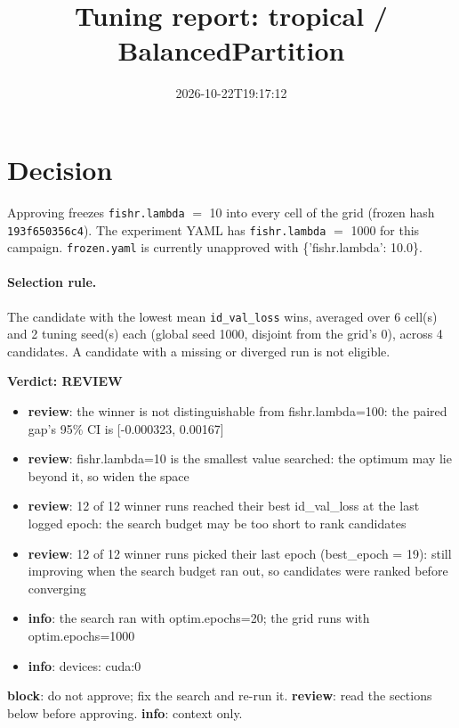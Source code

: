 \documentclass[10pt]{article}
\title{Tuning report: tropical / BalancedPartition}
\date{2026-10-22T19:17:12}
\begin{document}
\maketitle

\section{Decision}
Approving freezes
\texttt{fishr.lambda} $=$ 10 into every cell of the grid (frozen hash \texttt{193f650356c4}).
The experiment YAML has
\texttt{fishr.lambda} $=$ 1000 for this campaign.
\texttt{frozen.yaml} is currently unapproved with \{'fishr.lambda': 10.0\}.

\paragraph{Selection rule.} The candidate with the lowest mean \texttt{id\_val\_loss} wins, averaged over 6 cell(s) and 2 tuning seed(s) each (global seed 1000, disjoint from the grid's 0), across 4 candidates. A candidate with a missing or diverged run is not eligible.

\begin{framed}
\noindent\textbf{Verdict: \textcolor{orange!85!black}{REVIEW}}
\begin{itemize}\setlength\itemsep{0pt}
\item \textbf{review}: the winner is not distinguishable from fishr.lambda=100: the paired gap's 95\% CI is [-0.000323, 0.00167]
\item \textbf{review}: fishr.lambda=10 is the smallest value searched: the optimum may lie beyond it, so widen the space
\item \textbf{review}: 12 of 12 winner runs reached their best id\_val\_loss at the last logged epoch: the search budget may be too short to rank candidates
\item \textbf{review}: 12 of 12 winner runs picked their last epoch (best\_epoch = 19): still improving when the search budget ran out, so candidates were ranked before converging
\item \textbf{info}: the search ran with optim.epochs=20; the grid runs with optim.epochs=1000
\item \textbf{info}: devices: cuda:0
\end{itemize}
\end{framed}
\noindent\textbf{block}: do not approve; fix the search and re-run it. \textbf{review}: read the sections below before approving. \textbf{info}: context only.
\end{document}
